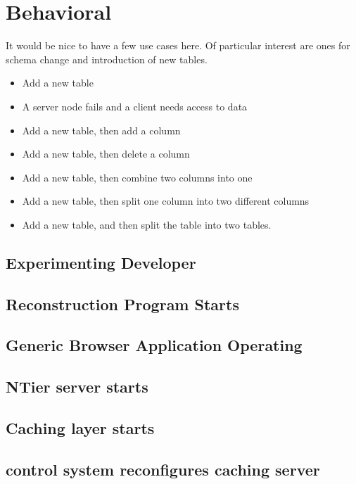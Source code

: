 \section{Behavioral}

\begin{fixme}
It would be nice to have a few use cases here. Of particular interest
are ones for schema change and introduction of new tables.
\end{fixme}

\begin{itemize}

\item Add a new table
\item A server node fails and a client needs access to data
\item Add a new table, then add a column
\item Add a new table, then delete a column
\item Add a new table, then combine two columns into one
\item Add a new table, then split one column into two different columns
\item Add a new table, and then split the table into two tables.

\end{itemize}

\subsection{Experimenting Developer}

\subsection{Reconstruction Program Starts}

\subsection{Generic Browser Application Operating}

\subsection{NTier server starts}

\subsection{Caching layer starts}

\subsection{control system reconfigures caching server}

